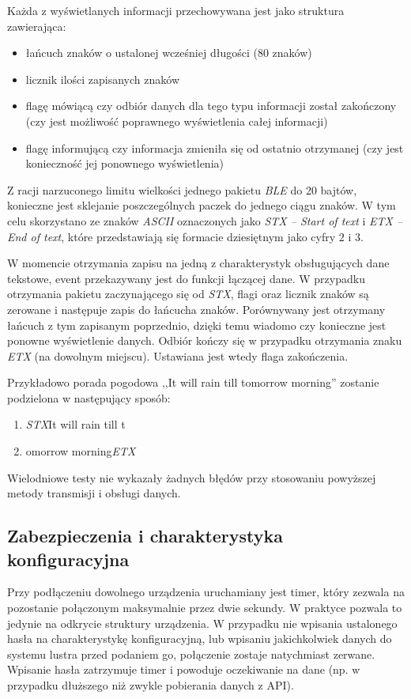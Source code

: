 \documentclass[a4paper,11pt]{article}
\begin{document}
Każda z wyświetlanych informacji przechowywana jest jako struktura zawierająca:
\begin{itemize}
	\item łańcuch znaków o ustalonej wcześniej długości (80 znaków)
	\item licznik ilości zapisanych znaków
	\item flagę mówiącą czy odbiór danych dla tego typu informacji został zakończony (czy jest możliwość poprawnego wyświetlenia całej informacji)
	\item flagę informującą czy informacja zmieniła się od ostatnio otrzymanej (czy jest konieczność jej ponownego wyświetlenia)
\end{itemize}

Z racji narzuconego limitu wielkości jednego pakietu \textit{BLE} do 20 bajtów, konieczne jest sklejanie poszczególnych paczek do jednego ciągu znaków. W tym celu skorzystano ze znaków \textit{ASCII}  oznaczonych jako \textit{STX -- Start of text} i \textit{ETX -- End of text}, które przedstawiają się formacie dziesiętnym jako cyfry $2$ i $3$.

W momencie otrzymania zapisu na jedną z charakterystyk obsługujących dane tekstowe, event przekazywany jest do funkcji łączącej dane. W przypadku otrzymania pakietu zaczynającego się od \textit{STX}, flagi oraz licznik znaków są zerowane i następuje zapis do łańcucha znaków. Porównywany jest otrzymany łańcuch z tym zapisanym poprzednio, dzięki temu wiadomo czy konieczne jest ponowne wyświetlenie danych. Odbiór kończy się w przypadku otrzymania znaku \textit{ETX} (na dowolnym miejscu). Ustawiana jest wtedy flaga zakończenia.

Przykładowo porada pogodowa ,,It will rain till tomorrow morning'' zostanie podzielona w następujący sposób:
\begin{enumerate}
	\item \textit{STX}It will rain till t
	\item omorrow morning\textit{ETX}
\end{enumerate}

Wielodniowe testy nie wykazały żadnych błędów przy stosowaniu powyższej metody transmisji i obsługi danych.

\subsection{Zabezpieczenia i charakterystyka konfiguracyjna}
Przy podłączeniu dowolnego urządzenia uruchamiany jest timer, który zezwala na pozostanie połączonym maksymalnie przez dwie sekundy. W praktyce pozwala to jedynie na odkrycie struktury urządzenia. W przypadku nie wpisania ustalonego hasła na charakterystykę konfiguracyjną, lub wpisaniu jakichkolwiek danych do systemu lustra przed podaniem go, połączenie zostaje natychmiast zerwane. Wpisanie hasła zatrzymuje timer i powoduje oczekiwanie na dane (np. w przypadku dłuższego niż zwykle pobierania danych z API).
\end{document}
